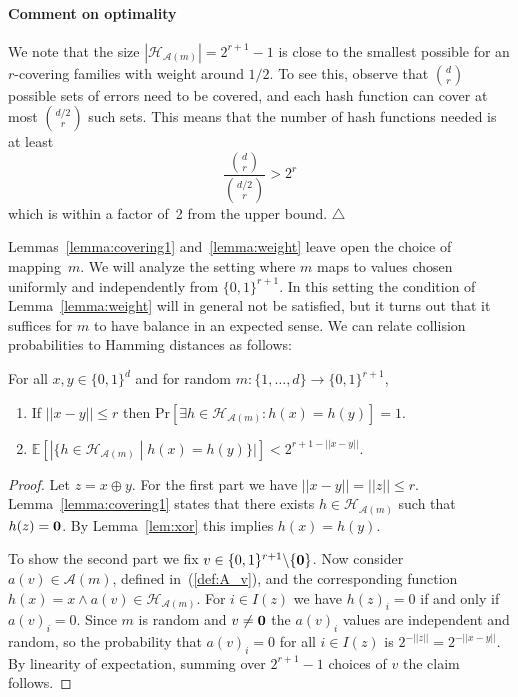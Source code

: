 \documentclass[prodmode,acmtalg]{acmsmall}
\newcommand{\E}[1]{\mathbb{E}\left[#1\right]}
\renewcommand{\Pr}[1]{\text{Pr}\left[#1\right]}
\begin{document}
\medskip

\paragraph{Comment on optimality}
We note that the size $|\mathcal{H}_{\mathcal{A}(m)}| = 2^{r+1}-1$ is close to the smallest possible for an $r$-covering families with weight around $1/2$.
To see this, observe that $\binom{d}{r}$ possible sets of errors need to be covered, and each hash function can cover at most $\binom{d/2}{r}$ such sets.
This means that the number of hash functions needed is at least 
$$\frac{\binom{d}{r}}{\binom{d/2}{r}} > 2^r$$
which is within a factor of~2 from the upper bound. $\triangle$

\medskip

Lemmas~\ref{lemma:covering1} and~\ref{lemma:weight} leave open the choice of mapping~$m$.
We will analyze the setting where $m$ maps to values chosen uniformly and independently from $\{0,1\}^{r+1}$. 
In this setting the condition of Lemma~\ref{lemma:weight} will in general not be satisfied, but it turns out that it suffices for $m$ to have balance in an expected sense.
We can relate collision probabilities to Hamming distances as follows:

\begin{theorem}\label{thm:basic}
	For all $x,y\in \{0,1\}^d$ and for random $m: \{1,\dots,d\} \rightarrow \{0,1\}^{r+1}$,
	\begin{enumerate}
\item If $||x-y||\leq r$ then $\Pr{\exists h\in \mathcal{H}_{\mathcal{A}(m)}: h(x)=h(y)} = 1$.
\item $\E{ | \{ h\in \mathcal{H}_{\mathcal{A}(m)} \;|\; h(x)=h(y) \} | } < 2^{r+1-||x-y||}$.
\end{enumerate}
\end{theorem}
\begin{proof}
Let $z = x \oplus y$.
For the first part we have $||x-y|| = ||z|| \leq r$.
Lemma~\ref{lemma:covering1} states that there exists 
$h\in \mathcal{H}_{\mathcal{A}(m)}$ such that $h(z)= {\bf 0}$.
By Lemma~\ref{lem:xor} this implies $h(x)=h(y)$.

To show the second part we fix $v\in \{0,1\}^{r+1} \backslash \{{\bf 0}\}$.
Now consider $a(v)\in\mathcal{A}(m)$, defined in~(\ref{def:A_v}), and the corresponding function $h(x) = x \wedge a(v) \in \mathcal{H}_{\mathcal{A}(m)}$.
For $i\in I(z)$ we have $h(z)_i = 0$ if and only if $a(v)_i = 0$.
Since $m$ is random and $v\ne {\bf 0}$ the $a(v)_i$ values are independent and random, so the probability that $a(v)_i = 0$ for all $i\in I(z)$ is $2^{-||z||} = 2^{-||x-y||}$.
By linearity of expectation, summing over $2^{r+1}-1$ choices of $v$ the claim follows. 
\end{proof}
\end{document}
